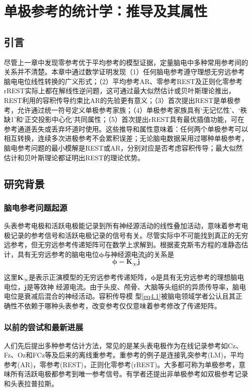 \chapter{单极参考的统计学：推导及其属性}
\section{引言}
尽管上一章中发现零参考优于平均参考的模型证据，定量脑电中多种常用参考间的关系并不清楚。本章中通过数学证明发现（1）任何脑电参考遵守理想无穷远参考脑电电位线性转换的广义形式；（2）平均参考AR、零参考REST及正则化零参考rREST实际上都在解线性逆问题，这可通过最大似然估计或贝叶斯理论推出，REST利用的容积传导约束比AR的先验更有意义；（3）首次提出REST是单极参考，允许通过统一符号定义单极参考家族；（4）单极参考家族具有‘无记忆性’、‘秩缺1’和‘正交投影中心化’共同属性；（5）首次提出rREST具有最优插值功能，可在参考通道丢失或丢弃坏道时使用。这些推导和属性意味着：任何两个单极参考可以相互转换，连续多次进极参考不会累积误差；无论脑电数据采用过哪种单极参考，脑电参考问题的最小模解是REST或AR，分别对应是否考虑容积传导；最大似然估计和贝叶斯理论都证明出REST的理论优势。

\section{研究背景}
\subsection{脑电参考问题起源}
头表参考电极和活跃电极能记录到所有神经源活动的线性叠加活动，意味着参考电极记录的参考信号和活跃电极记录的信号有关。尽管实际中不可能找到真正的无穷远参考，但无穷远参考传递矩阵可在数学上求解到。根据麦克斯韦方程的准静态估计，具有无穷远参考的脑电电位$\mathbf{\phi}$与神经源电流$\mathbf{j}$的关系是
\begin{equation}\label{eq4.1}
\mathbf{\phi}=\mathbf{K}_{\infty}\mathbf{j}
\end{equation}

这里$\mathbf{K}_\infty$是表示正演模型的无穷远参考传递矩阵，$\mathbf{\phi}$是具有无穷远参考的理想脑电电位，$\mathbf{j}$是等效神
经源电流。由于头皮、颅骨、大脑等头组织的异质传导率，脑电电位是衰减后混合的神经活动。容积传导模
型\eqref{eq4.1}被脑电领域学者公认且其正确性不依赖于哪种头表参考，改变参考仅仅意味着参考修改了传递矩阵。

\subsection{以前的尝试和最新进展}
人们先后提出多种参考估计方法，常见的是某头表电极作为在线记录参考如Cz、Fz、Oz和FCz等及后来的离线重参考。重参考的例子是连接乳突参考(LM)，平均参考(AR)，零参考(REST)，正则化零参考(rREST)。大多都可称为单极参考，意味所有活跃电极都参考到唯一参考信号。有学者还提出非单极参考如双极参考记录和头表拉普拉斯。

